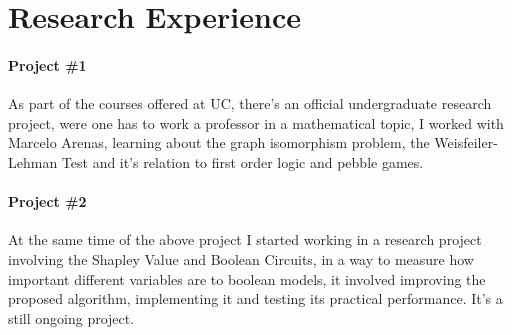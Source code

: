 \documentclass[letterpaper]{article}
\begin{document}
\section*{Research Experience}
\paragraph{Project \#1}
As part of the courses offered at UC, there's an official undergraduate research project, were one has to work a professor in a mathematical topic, I worked with Marcelo Arenas, learning about the graph isomorphism problem, the Weisfeiler-Lehman Test and it's relation to first order logic and pebble games.

\paragraph{Project \#2}
At the same time of the above project I started working in a research project involving the Shapley Value and Boolean Circuits, in a way to measure how important different variables are to boolean models, it involved improving the proposed algorithm, implementing it and testing its practical performance. It's a still ongoing project.
\end{document}
